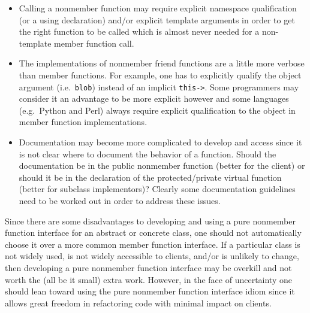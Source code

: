 \documentclass[pdf,ps2pdf,11pt]{SANDreport}
\begin{document}
\begin{itemize}

{}\item Calling a nonmember function may require explicit namespace
qualification (or a using declaration) and/or explicit template arguments in
order to get the right function to be called which is almost never needed for
a non-template member function call.

{}\item The implementations of nonmember friend functions are a little more
verbose than member functions.  For example, one has to explicitly qualify the
object argument (i.e.\ {}\texttt{blob}) instead of an implicit
{}\texttt{this->}.  Some programmers may consider it an advantage to be more
explicit however and some languages (e.g.\ Python and Perl) always require
explicit qualification to the object in member function implementations.

{}\item Documentation may become more complicated to develop and access since
it is not clear where to document the behavior of a function.  Should the
documentation be in the public nonmember function (better for the client) or
should it be in the declaration of the protected/private virtual function
(better for subclass implementors)?  Clearly some documentation guidelines
need to be worked out in order to address these issues.

\end{itemize}

Since there are some disadvantages to developing and using a pure nonmember
function interface for an abstract or concrete class, one should not
automatically choose it over a more common member function interface.  If a
particular class is not widely used, is not widely accessible to clients,
and/or is unlikely to change, then developing a pure nonmember function
interface may be overkill and not worth the (all be it small) extra work.
However, in the face of uncertainty one should lean toward using the pure
nonmember function interface idiom since it allows great freedom in
refactoring code with minimal impact on clients.


%
\clearpage



%
\appendix
%
\end{document}
